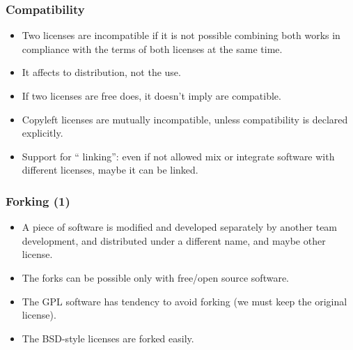 \documentclass{beamer}
\begin{document}

\begin{frame}
\frametitle{Compatibility}

\begin{itemize}
\item Two licenses are incompatible if it is not possible combining both works in compliance with the terms of  both licenses at the same time. 
\item It affects to distribution, not the use. 
\item If two licenses are free does, it doesn't imply are compatible. 
\item Copyleft licenses are mutually incompatible, unless compatibility is declared explicitly. 
\item Support for `` linking'': even if not allowed mix or integrate software with different licenses, maybe it can be linked. 
\end{itemize}

\end{frame}


\begin{frame}
\frametitle{Forking (1)}

\begin{itemize}
\item A piece of software is modified and developed separately by another team development, and distributed under a different name, and maybe other
license.
\item The forks can be possible \alert{only} with free/open source software.
\item The GPL software has tendency to avoid forking (we must keep the original license).
\item The BSD-style licenses are forked easily.
\end{itemize}

\end{frame}

\end{document}
